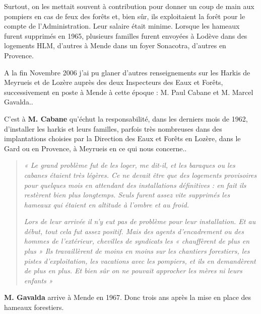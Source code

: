 Surtout, on les mettait souvent à contribution pour donner un coup de main aux
pompiers en cas de feux des forêts et, bien sûr, ils exploitaient la forêt pour le compte
de l’Administration. Leur salaire était minime.
Lorsque les hameaux furent supprimés en 1965, plusieurs familles furent envoyées à
Lodève dans des logements HLM, d’autres à Mende dans un foyer Sonacotra, d’autres
en Provence.

A la fin Novembre 2006 j’ai pu glaner d’autres renseignements sur les Harkis de
Meyrueis et de Lozère auprès des deux Inspecteurs des Eaux et Forêts, successivement
en poste à Mende à cette époque : M. Paul Cabane et M. Marcel Gavalda..

C’est à \textbf{M. Cabane} qu’échut la responsabilité, dans les derniers mois de
1962, d’installer les harkis et leurs familles, parfois très nombreuses dans des
implantations choisies par la Direction des Eaux et Forêts en Lozère, dans le Gard ou
en Provence, à Meyrueis en ce qui nous concerne..

\begin{quote}
\textit{« Le grand problème fut de les loger, me dit-il, et les baraques ou les cabanes
étaient très légères. Ce ne devait être que des logements provisoires pour quelques
mois en attendant des installations définitives : en fait ils restèrent bien plus
longtemps. Seuls furent assez vite supprimés les hameaux qui étaient en altitude à
l’ombre et au froid.}

\textit{Lors de leur arrivée il n’y eut pas de problème pour leur installation. Et au début,
tout cela fut assez positif. Mais des agents d’encadrement ou des hommes de
l’extérieur, chevilles de syndicats les « chauffèrent de plus en plus » Ils travaillèrent
de moins en moins sur les chantiers forestiers, les pistes d’exploitation, les vacations
avec les pompiers, et ils en demandèrent de plus en plus. Et bien sûr on ne pouvait
approcher les mères ni leurs enfants »}
\end{quote}

\textbf{M. Gavalda} arrive à Mende en 1967. Donc trois ans après la mise en place des
hameaux forestiers.

